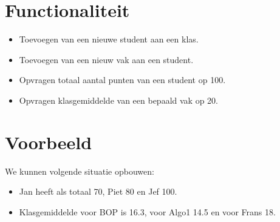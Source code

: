 \documentclass[a4paper]{article}
\begin{document}
\section{Functionaliteit}
\begin{itemize}
  \item Toevoegen van een nieuwe student aan een klas.
  \item Toevoegen van een nieuw vak aan een student.
  \item Opvragen totaal aantal punten van een student op 100.
  \item Opvragen klasgemiddelde van een bepaald vak op 20.
\end{itemize}

{
\newcommand{\student}[2]{
  \node[inner sep=0mm] (#1) at (#2) { \begin{tabular}{|c|} \hline {\bf :Student} \\ \hline naam:#1 \\ \hline \end{tabular} };
}
\newcommand{\vak}[4][]{
   \node[inner sep=0mm] (#1 #2) at (#4) { \begin{tabular}{|c|} \hline {\bf :Vak} \\ \hline naam:#2 \\ punten:#3 \\ \hline \end{tabular}};
}
\newcommand{\inklas}[1]{
  \draw[->] (klas) -- (#1);
}
\newcommand{\volgt}[2]{
  \draw[->] (#1) -- (#1 #2);
}

\section{Voorbeeld}
We kunnen volgende situatie opbouwen:
\begin{center}
\end{center}
}
\begin{itemize}
  \item Jan heeft als totaal 70, Piet 80 en Jef 100.
  \item Klasgemiddelde voor BOP is 16.3, voor Algo1 14.5 en voor Frans 18.
\end{itemize}
\end{document}
